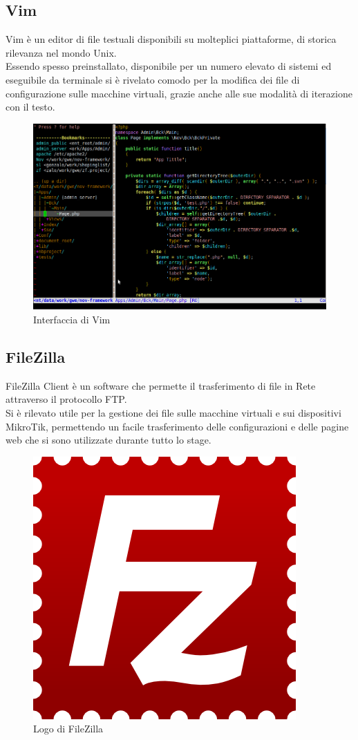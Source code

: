 \documentclass[Tesi.tex]{subfiles}
\begin{document}
\subsection{Vim}
Vim è un editor di file testuali disponibili su molteplici piattaforme, di storica rilevanza nel mondo Unix. \\
Essendo spesso preinstallato, disponibile per un numero elevato di sistemi ed eseguibile da terminale si è rivelato comodo per la modifica dei file di configurazione sulle macchine virtuali, grazie anche alle sue modalità di iterazione con il testo.
\begin{figure}[H]
	\centering
	\includegraphics[width=0.75\linewidth]{"images/vim"}
	\caption{Interfaccia di Vim}
	\label{fig:Interfaccia di Vim}
\end{figure}


\subsection{FileZilla}
FileZilla Client è un software che permette il trasferimento di file in Rete attraverso il protocollo FTP. \\
Si è rilevato utile per la gestione dei file sulle macchine virtuali e sui dispositivi MikroTik, permettendo un facile trasferimento delle configurazioni e delle pagine web che si sono utilizzate durante tutto lo stage.
\begin{figure}[H]
	\centering
	\includegraphics[width=0.22\linewidth]{"images/logo/Filezilla_logo"}
	\caption{Logo di FileZilla}
	\label{fig:Logo di FileZilla}
\end{figure}
\end{document}

